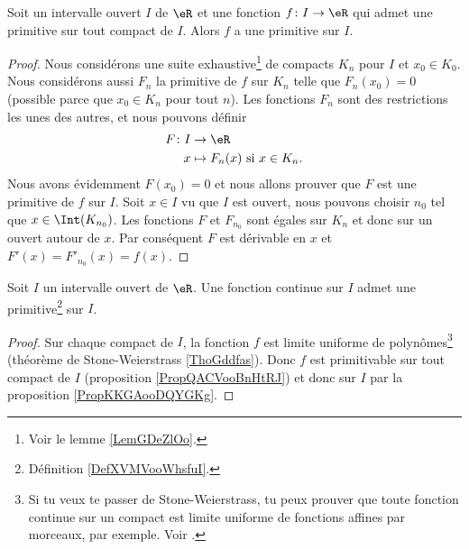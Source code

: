 \begin{proposition}        \label{PropKKGAooDQYGKg}
    Soit un intervalle ouvert \( I\) de \( \eR\) et une fonction \( f\colon I\to \eR\) qui admet une primitive sur tout compact de \( I\). Alors \( f\) a une primitive sur \( I\).
\end{proposition}

\begin{proof}
    Nous considérons une suite exhaustive\footnote{Voir le lemme \ref{LemGDeZlOo}.} de compacts \( K_n\) pour \( I\) et \( x_0\in K_0\). Nous considérons aussi \( F_n\) la primitive de \( f\) sur \( K_n\) telle que \( F_n(x_0)=0\) (possible parce que \( x_0\in K_n\) pour tout \( n\)). Les fonctions \( F_n\) sont des restrictions les unes des autres, et nous pouvons définir
    \begin{equation}
        \begin{aligned}
            F\colon I&\to \eR \\
            x&\mapsto F_n(x)\text{ si } x\in K_n. 
        \end{aligned}
    \end{equation}
    Nous avons évidemment \( F(x_0)=0\) et nous allons prouver que \( F\) est une primitive de \( f\) sur \( I\). Soit \( x\in I\) vu que \( I\) est ouvert, nous pouvons choisir \( n_0\) tel que \( x\in\Int(K_{n_0})\). Les fonctions \( F\) et \( F_{n_0}\) sont égales sur \( K_n\) et donc sur un ouvert autour de \( x\). Par conséquent \( F\) est dérivable en \( x\) et \( F'(x)=F'_{n_0}(x)=f(x)\).
\end{proof}

\begin{theorem}    \label{ThoEXXyooCLwgQg}
    Soit \( I\) un intervalle ouvert de \( \eR\). Une fonction continue sur \( I\) admet une primitive\footnote{Définition \ref{DefXVMVooWhsfuI}.} sur \( I\).
\end{theorem}

\begin{proof}
    Sur chaque compact de \( I\), la fonction \( f\) est limite uniforme de polynômes\footnote{Si tu veux te passer de Stone-Weierstrass, tu peux prouver que toute fonction continue sur un compact est limite uniforme de fonctions affines par morceaux, par exemple. Voir \cite{MQKDooSuEGxk}.} (théorème de Stone-Weierstrass \ref{ThoGddfas}). Donc \( f\) est primitivable sur tout compact de \( I\) (proposition \ref{PropQACVooBnHtRJ}) et donc sur \( I\) par la proposition \ref{PropKKGAooDQYGKg}.
\end{proof}

